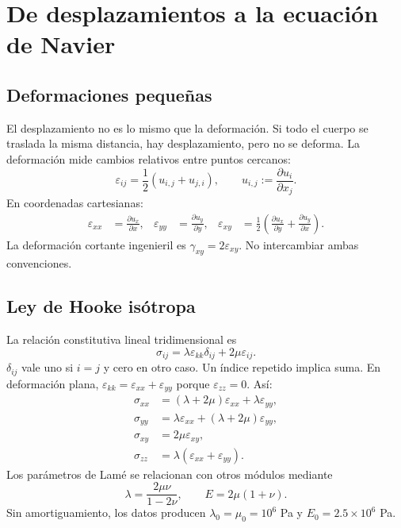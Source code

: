 \documentclass[11pt,a4paper]{report}
\numberwithin{equation}{chapter}
\begin{document}
\chapter{De desplazamientos a la ecuaci\'on de Navier}
\label{ch:navier}

\section{Deformaciones peque\~nas}
El desplazamiento no es lo mismo que la deformaci\'on. Si todo el cuerpo
se traslada la misma distancia, hay desplazamiento, pero no se deforma.
La deformaci\'on mide cambios relativos entre puntos cercanos:
\begin{equation}
  \varepsilon_{ij}=\frac12(u_{i,j}+u_{j,i}),\qquad
  u_{i,j}:=\frac{\partial u_i}{\partial x_j}.
  \label{eq:strain}
\end{equation}
En coordenadas cartesianas:
\begin{align}
 \varepsilon_{xx}&=\frac{\partial u_x}{\partial x},&
 \varepsilon_{yy}&=\frac{\partial u_y}{\partial y},&
 \varepsilon_{xy}&=\frac12\left(
       \frac{\partial u_x}{\partial y}+\frac{\partial u_y}{\partial x}\right).
\end{align}
La deformaci\'on cortante ingenieril es
$\gamma_{xy}=2\varepsilon_{xy}$. No intercambiar ambas convenciones.

\section{Ley de Hooke is\'otropa}
La relaci\'on constitutiva lineal tridimensional es
\begin{equation}
 \sigma_{ij}=\lambda\varepsilon_{kk}\delta_{ij}
                   +2\mu\varepsilon_{ij}.
 \label{eq:hooke}
\end{equation}
$\delta_{ij}$ vale uno si $i=j$ y cero en otro caso.
Un \'indice repetido implica suma. En deformaci\'on plana,
$\varepsilon_{kk}=\varepsilon_{xx}+\varepsilon_{yy}$ porque
$\varepsilon_{zz}=0$. As\'i:
\begin{align}
 \sigma_{xx}&=(\lambda+2\mu)\varepsilon_{xx}+\lambda\varepsilon_{yy},\\
 \sigma_{yy}&=\lambda\varepsilon_{xx}+(\lambda+2\mu)\varepsilon_{yy},\\
 \sigma_{xy}&=2\mu\varepsilon_{xy},\\
 \sigma_{zz}&=\lambda(\varepsilon_{xx}+\varepsilon_{yy}).
\end{align}
Los par\'ametros de Lam\'e se relacionan con otros m\'odulos mediante
\begin{equation}
  \lambda=\frac{2\mu\nu}{1-2\nu},\qquad E=2\mu(1+\nu).
\end{equation}
Sin amortiguamiento, los datos producen
$\lambda_0=\mu_0=10^6$ Pa y $E_0=2.5\times10^6$ Pa.
\end{document}

